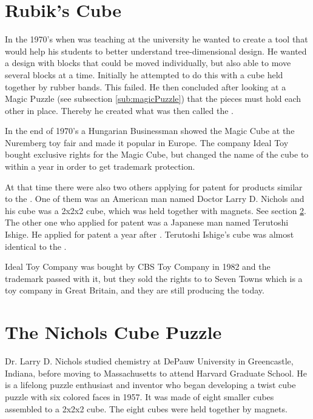 \section{Rubik's Cube}

In the 1970's when \erno{} was teaching at the university he wanted to create a tool that would help his students to better understand tree-dimensional design. 
He wanted a design with blocks that could be moved individually, but also able to move several blocks at a time. 
Initially he attempted to do this with a cube held together by rubber bands. 
This failed. 
He then concluded after looking at a  Magic Puzzle (see subsection \ref{sub:magicPuzzle}) that the pieces must hold each other in place. 
Thereby he created what was then called the \mcube{}. 

In the end of 1970's a Hungarian Businessman showed the Magic Cube at the Nuremberg toy fair and made it popular in Europe. 
The company Ideal Toy bought exclusive rights for the Magic Cube, but changed the name of the cube to \rubik{} within a year in order to get trademark protection.

At that time there were also two others applying for patent for products similar to the \rubik{}.  
One of them was an American man named Doctor Larry D. Nichols and his cube was a 2x2x2 cube, which was held together with magnets. See section \ref{sec:nichols}. 
The other one who applied for patent was a Japanese man named Terutoshi Ishige. 
He applied for patent a year after \erno{}. 
Terutoshi Ishige's cube was almost identical to the \rubik{}.

Ideal Toy Company was bought by CBS Toy Company in 1982 and the trademark passed with it, but they sold the rights to \rubik{} to Seven Towns which is a toy company in Great Britain, and they are still producing the \rubik{} today.

\section{The Nichols Cube Puzzle}
\label{sec:nichols}
Dr. Larry D. Nichols studied chemistry at DePauw University in Greencastle, Indiana, before moving to Massachusetts to attend Harvard Graduate School. 
He is a lifelong puzzle enthusiast and inventor who  began developing a twist cube puzzle with six colored faces in 1957. 
It was made of eight smaller cubes assembled to a 2x2x2 cube. 
The eight cubes were held together by magnets.

